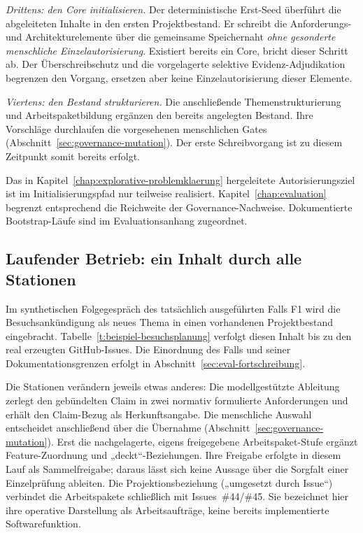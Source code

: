 \emph{Drittens: den Core initialisieren.} Der deterministische
Erst-Seed überführt die abgeleiteten Inhalte in den ersten
Projektbestand. Er schreibt die Anforderungs- und Architekturelemente
über die gemeinsame Speichernaht \emph{ohne gesonderte menschliche
Einzelautorisierung}. Existiert bereits ein Core, bricht dieser
Schritt ab. Der Überschreibschutz und die vorgelagerte selektive
Evidenz-Adjudikation begrenzen den Vorgang, ersetzen aber keine
Einzelautorisierung dieser Elemente.

\emph{Viertens: den Bestand strukturieren.} Die anschließende
Themenstrukturierung und Arbeitspaketbildung ergänzen den bereits
angelegten Bestand. Ihre Vorschläge durchlaufen die vorgesehenen
menschlichen Gates (Abschnitt~\ref{sec:governance-mutation}). Der
erste Schreibvorgang ist zu diesem Zeitpunkt somit bereits erfolgt.

Das in Kapitel~\ref{chap:explorative-problemklaerung} hergeleitete
Autorisierungsziel ist im Initialisierungspfad nur teilweise
realisiert. Kapitel~\ref{chap:evaluation} begrenzt entsprechend die
Reichweite der Governance-Nachweise. Dokumentierte Bootstrap-Läufe
sind im Evaluationsanhang zugeordnet.

\subsection*{Laufender Betrieb: ein Inhalt durch alle Stationen}

Im synthetischen Folgegespräch des tatsächlich ausgeführten Falls F1
wird die Besuchsankündigung als neues Thema in einen vorhandenen
Projektbestand eingebracht. Tabelle~\ref{t:beispiel-besuchsplanung}
verfolgt diesen Inhalt bis zu den real erzeugten GitHub-Issues.
Die Einordnung des Falls und seiner Dokumentationsgrenzen erfolgt
in Abschnitt~\ref{sec:eval-fortschreibung}.



Die Stationen verändern jeweils etwas anderes: Die modellgestützte
Ableitung zerlegt den gebündelten Claim in zwei normativ formulierte
Anforderungen und erhält den Claim-Bezug als Herkunftsangabe. Die
menschliche Auswahl entscheidet anschließend über die Übernahme
(Abschnitt~\ref{sec:governance-mutation}). Erst die nachgelagerte,
eigens freigegebene Arbeitspaket-Stufe ergänzt Feature-Zuordnung und
„deckt``-Beziehungen. Ihre Freigabe erfolgte in diesem Lauf als
Sammelfreigabe; daraus lässt sich keine Aussage über die Sorgfalt
einer Einzelprüfung ableiten. Die Projektionsbeziehung
(„umgesetzt durch Issue``) verbindet die Arbeitspakete schließlich
mit Issues~\#44/\#45. Sie bezeichnet hier ihre operative
Darstellung als Arbeitsaufträge, keine bereits implementierte
Softwarefunktion.

